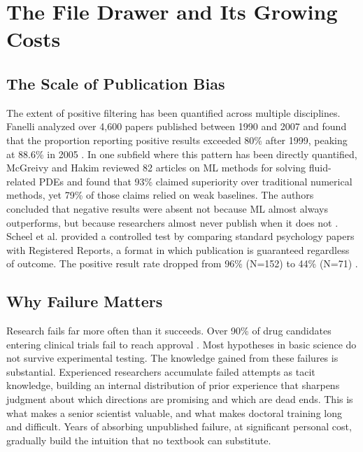 \section{The File Drawer and Its Growing Costs}
\label{sec:background}

\subsection{The Scale of Publication Bias}

The extent of positive filtering has been quantified across multiple
disciplines. Fanelli analyzed over 4,600 papers published between
1990 and 2007 and found that the proportion reporting positive
results exceeded 80\% after 1999, peaking at 88.6\% in 2005
\citep{fanelli2012negative}. In one subfield where this pattern has
been directly quantified, McGreivy and Hakim reviewed 82 articles on
ML methods for solving fluid-related PDEs and found that 93\% claimed
superiority over traditional numerical methods, yet 79\% of those
claims relied on weak baselines. The authors concluded that negative
results were absent not because ML almost always outperforms, but
because researchers almost never publish when it does not
\citep{mcgreivy2024replacing}. Scheel et al. provided a controlled
test by comparing standard psychology papers with Registered Reports,
a format in which publication is guaranteed regardless of outcome.
The positive result rate dropped from 96\% (N=152) to 44\% (N=71)
\citep{scheel2021excess}.

\subsection{Why Failure Matters}

Research fails far more often than it succeeds. Over 90\% of drug
candidates entering clinical trials fail to reach approval
\citep{sun2022clinical}. Most hypotheses in basic science do not
survive experimental testing. The knowledge gained from these
failures is substantial. Experienced researchers accumulate failed
attempts as tacit knowledge, building an internal distribution of
prior experience that sharpens judgment about which directions are
promising and which are dead ends. This is what makes a senior
scientist valuable, and what makes doctoral training long and
difficult. Years of absorbing unpublished failure, at significant
personal cost, gradually build the intuition that no textbook can
substitute.

